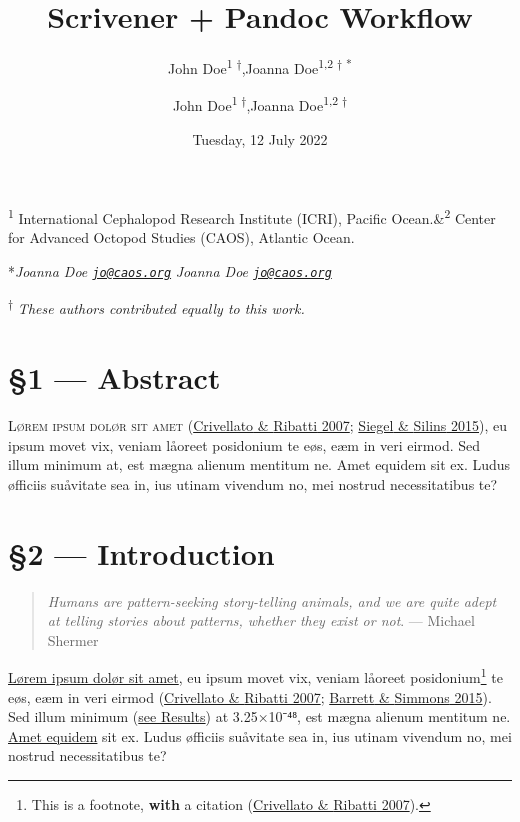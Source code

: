 \documentclass[
  12pt,
  a4paper,
]{article}
\title{Scrivener + Pandoc Workflow}
\author{\textsf{John Doe\textsuperscript{1 †},\quad Joanna
Doe\textsuperscript{1,2 † *}}}
\author{\textsf{John Doe\textsuperscript{1 †},\quad Joanna
Doe\textsuperscript{1,2 † \fixfontB{✉︎}}}}
\date{Tuesday, 12 July 2022}
\begin{document}
\maketitle

\begin{center}

\textsf{\textsuperscript{1} International Cephalopod Research Institute
(ICRI), Pacific Ocean.\quad\&\quad\textsuperscript{2} Center for
Advanced Octopod Studies (CAOS), Atlantic Ocean.}

\ifPDFTeX
\textsf{*\emph{Joanna Doe
\href{mailto:jo@caos.org}{\nolinkurl{jo@caos.org}}}}
\else
\textsf{ \emph{Joanna Doe
\href{mailto:jo@caos.org}{\nolinkurl{jo@caos.org}}}}
\fi

\textsf{\textsuperscript{†} \small{\emph{These authors contributed equally to this work.}}}


\end{center}


{
\hypersetup{linkcolor=}
\setcounter{tocdepth}{4}
\tableofcontents
}
\hypertarget{abstract}{%
\section{§1 --- Abstract}\label{abstract}}

\textsc{Lørem ipsum dolør sit amet}
(\protect\hyperlink{ref-crivellato2007}{{Crivellato} \& {Ribatti} 2007};
\protect\hyperlink{ref-siegel2015}{{Siegel} \& {Silins} 2015}), eu ipsum
movet vix, veniam låoreet posidonium te eøs, eæm in veri eirmod. Sed
illum minimum at, est mægna alienum mentitum ne. Amet equidem sit ex.
Ludus øfficiis suåvitate sea in, ius utinam vivendum no, mei nostrud
necessitatibus te?

\hypertarget{introduction}{%
\section{§2 --- Introduction}\label{introduction}}

\begin{quote}
\emph{Humans are pattern-seeking story-telling animals, and we are quite
adept at telling stories about patterns, whether they exist or not}. ---
Michael Shermer
\end{quote}

\uline{Lørem ipsum dolør sit amet}, eu ipsum movet vix, veniam låoreet
posidonium\footnote{This is a footnote, \textbf{with} a citation
  (\protect\hyperlink{ref-crivellato2007}{{Crivellato} \& {Ribatti}
  2007}).} te eøs, eæm in veri eirmod
(\protect\hyperlink{ref-crivellato2007}{{Crivellato} \& {Ribatti} 2007};
\protect\hyperlink{ref-barrett2015}{{Barrett} \& {Simmons} 2015}). Sed
illum minimum (\protect\hyperlink{lunar-cycles}{see Results}) at
3.25×10⁻⁴⁸, est mægna alienum mentitum ne.
\href{https://pandoc.org/MANUAL.html}{Amet equidem} sit ex. Ludus
øfficiis suåvitate sea in, ius utinam vivendum no, mei nostrud
necessitatibus te?
\end{document}
